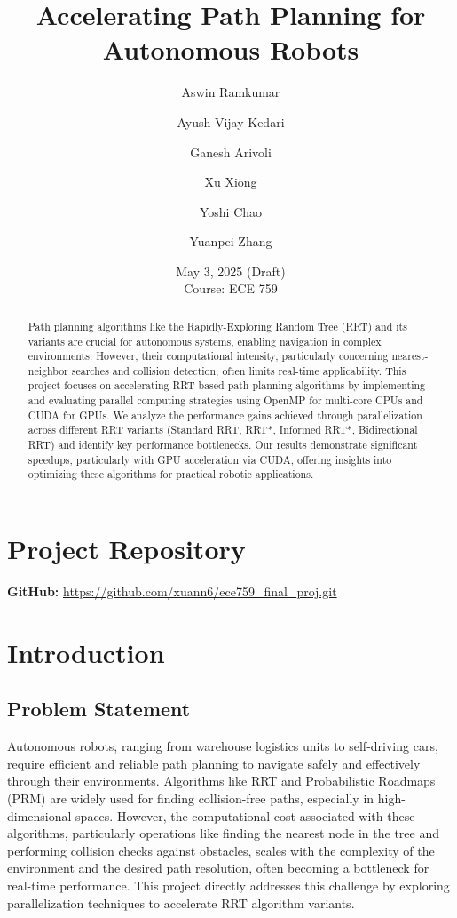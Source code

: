 \documentclass{article}
\title{Accelerating Path Planning for Autonomous Robots}
\author{Aswin Ramkumar \and Ayush Vijay Kedari \and Ganesh Arivoli \and Xu Xiong \and Yoshi Chao \and Yuanpei Zhang}
\date{May 3, 2025 (Draft) \\ Course: ECE 759}
\begin{document}
\maketitle

\section*{Project Repository}
\textbf{GitHub:} \url{https://github.com/xuann6/ece759_final_proj.git}

\begin{abstract}
Path planning algorithms like the Rapidly-Exploring Random Tree (RRT) and its variants are crucial for autonomous systems, enabling navigation in complex environments. However, their computational intensity, particularly concerning nearest-neighbor searches and collision detection, often limits real-time applicability. This project focuses on accelerating RRT-based path planning algorithms by implementing and evaluating parallel computing strategies using OpenMP for multi-core CPUs and CUDA for GPUs. We analyze the performance gains achieved through parallelization across different RRT variants (Standard RRT, RRT*, Informed RRT*, Bidirectional RRT) and identify key performance bottlenecks. Our results demonstrate significant speedups, particularly with GPU acceleration via CUDA, offering insights into optimizing these algorithms for practical robotic applications.
\end{abstract}

\section{Introduction}

\subsection{Problem Statement}
Autonomous robots, ranging from warehouse logistics units to self-driving cars, require efficient and reliable path planning to navigate safely and effectively through their environments. Algorithms like RRT and Probabilistic Roadmaps (PRM) are widely used for finding collision-free paths, especially in high-dimensional spaces. However, the computational cost associated with these algorithms, particularly operations like finding the nearest node in the tree and performing collision checks against obstacles, scales with the complexity of the environment and the desired path resolution, often becoming a bottleneck for real-time performance. This project directly addresses this challenge by exploring parallelization techniques to accelerate RRT algorithm variants.
\end{document}
